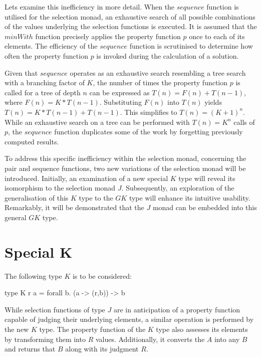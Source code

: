 \documentclass[runningheads]{llncs}
\begin{document}
Lets examine this inefficiency in more detail. When the \(sequence\)
function is utilised for the selection monad, an exhaustive search of
all possible combinations of the values underlying the selection
functions is executed. It is assumed that the \(minWith\) function
precisely applies the property function \(p\) once to each of its
elements. The efficiency of the \(sequence\) function is scrutinised to
determine how often the property function \(p\) is invoked during the
calculation of a solution.

Given that \(sequence\) operates as an exhaustive search resembling a
tree search with a branching factor of \(K\), the number of times the
property function \(p\) is called for a tree of depth \(n\) can be
expressed as \(T(n) = F(n) + T(n-1)\), where \(F(n) = K * T(n-1)\).
Substituting \(F(n)\) into \(T(n)\) yields
\(T(n) = K * T(n-1) + T(n-1)\). This simplifies to \(T(n) = (K + 1)^n\).
While an exhaustive search on a tree can be performed with
\(T(n) = K^n\) calls of \(p\), the \(sequence\) function duplicates some
of the work by forgetting previously computed results.

To address this specific inefficiency within the selection monad,
concerning the pair and sequence functions, two new variations of the
selection monad will be introduced. Initially, an examination of a new
special \(K\) type will reveal its isomorphism to the selection monad
\(J\). Subsequently, an exploration of the generalisation of this \(K\)
type to the \(GK\) type will enhance its intuitive usability.
Remarkably, it will be demonstrated that the \(J\) monad can be embedded
into this general \(GK\) type.

\section{Special K}\label{special-k}

The following type \(K\) is to be considered:

\begin{code}
type K r a = forall b. (a -> (r,b)) -> b
\end{code}

While selection functions of type \(J\) are in anticipation of a
property function capable of judging their underlying elements, a
similar operation is performed by the new \(K\) type. The property
function of the \(K\) type also assesses its elements by transforming
them into \(R\) values. Additionally, it converts the \(A\) into any
\(B\) and returns that \(B\) along with its judgment \(R\).
\end{document}

